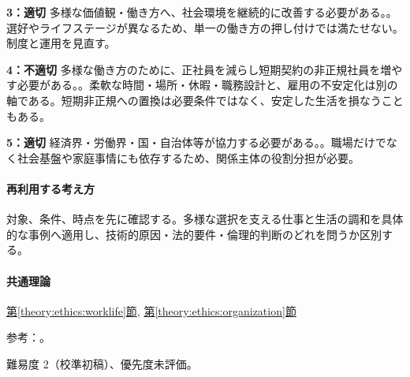 \noindent\textbf{3：適切} 多様な価値観・働き方へ、社会環境を継続的に改善する必要がある。。選好やライフステージが異なるため、単一の働き方の押し付けでは満たせない。制度と運用を見直す。\par

\noindent\textbf{4：不適切} 多様な働き方のために、正社員を減らし短期契約の非正規社員を増やす必要がある。。柔軟な時間・場所・休暇・職務設計と、雇用の不安定化は別の軸である。短期非正規への置換は必要条件ではなく、安定した生活を損なうこともある。\par

\noindent\textbf{5：適切} 経済界・労働界・国・自治体等が協力する必要がある。。職場だけでなく社会基盤や家庭事情にも依存するため、関係主体の役割分担が必要。\par

\paragraph{再利用する考え方} 対象、条件、時点を先に確認する。多様な選択を支える仕事と生活の調和を具体的な事例へ適用し、技術的原因・法的要件・倫理的判断のどれを問うか区別する。

\paragraph{共通理論} \hyperref[theory:ethics:worklife]{第\ref*{theory:ethics:worklife}節}, \hyperref[theory:ethics:organization]{第\ref*{theory:ethics:organization}節}

\par 参考：\cite{cabinet_worklife}。

\par 難易度 2（校準初稿）、優先度未評価。

